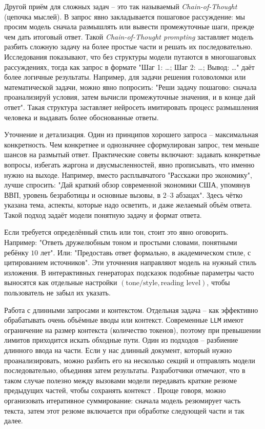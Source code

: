 Другой приём для сложных задач – это так называемый \textit{Chain-of-Thought} (цепочка мыслей). В запрос явно закладывается пошаговое рассуждение: мы просим модель сначала размышлять или вывести промежуточные шаги, прежде чем дать итоговый ответ. Такой \textit{Chain-of-Thought prompting} заставляет модель разбить сложную задачу на более простые части и решать их последовательно\cite{lakera:2025}. Исследования показывают, что без структуры модели путаются в многошаговых рассуждениях, тогда как запрос в формате "Шаг 1: \dots; Шаг 2: \dots; Вывод: \dots" даёт более логичные результаты\cite{lakera:2025}. Например, для задачи решения головоломки или математической задачи, можно явно попросить: "Реши задачу пошагово: сначала проанализируй условия, затем вычисли промежуточные значения, и в конце дай ответ". Такая структура заставляет нейросеть имитировать процесс размышления человека и выдавать более обоснованные ответы.

Уточнение и детализация. Один из принципов хорошего запроса – максимальная конкретность. Чем конкретнее и однозначнее сформулирован запрос, тем меньше шансов на размытый ответ. Практические советы включают: задавать конкретные вопросы, избегать жаргона и двусмысленностей, явно прописывать, что именно нужно на выходе\cite{lakera:2025}. Например, вместо расплывчатого "Расскажи про экономику", лучше спросить: "Дай краткий обзор современной экономики США, упомянув ВВП, уровень безработицы и основные вызовы, в \(2\text{--}3\) абзацах". Здесь чётко указана тема, аспекты, которые надо осветить, и даже желаемый объём ответа. Такой подход задаёт модели понятную задачу и формат ответа\cite{copilotworks:promptgen}.

Если требуется определённый стиль или тон, стоит это явно оговорить. Например: "Ответь дружелюбным тоном и простыми словами, понятными ребёнку \(10\) лет". Или: "Предоставь ответ формально, в академическом стиле, с цитированием источников". Эти уточнения направляют модель на нужный стиль изложения. В интерактивных генераторах подсказок подобные параметры часто выносятся как отдельные настройки \((\text{tone/style}, \text{reading level})\), чтобы пользователь не забыл их указать\cite{copilotworks:promptgen}.

Работа с длинными запросами и контекстом. Отдельная задача – как эффективно обрабатывать очень объёмные вводы или контекст. Современные \texttt{LLM} имеют ограничение на размер контекста (количество токенов), поэтому при превышении лимитов приходится искать обходные пути. Один из подходов – разбиение длинного ввода на части. Если у нас длинный документ, который нужно проанализировать, можно разбить его на несколько секций и отправлять модели последовательно, объединяя затем результаты. Разработчики отмечают, что в таком случае полезно между вызовами модели передавать краткие резюме предыдущих частей, чтобы сохранять контекст \cite{openai:longprompts}. Проще говоря, можно организовать итеративное суммирование: сначала модель резюмирует часть текста, затем этот резюме включается при обработке следующей части и так далее.


